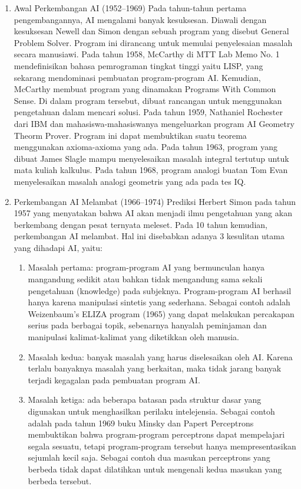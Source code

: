 \begin{enumerate}
	\item Awal Perkembangan AI (1952–1969)
	\hfill\break
	Pada tahun-tahun pertama pengembangannya, AI mengalami banyak kesuksesan. Diawali dengan kesuksesan Newell dan Simon dengan sebuah program yang disebut General Problem Solver. Program ini dirancang untuk memulai penyelesaian masalah secara manusiawi. Pada tahun 1958, McCarthy di MTT Lab Memo No. 1 mendefinisikan bahasa pemrograman tingkat tinggi yaitu LISP, yang sekarang mendominasi pembuatan program-program AI. Kemudian, McCarthy membuat program yang dinamakan Programs With Common Sense. Di dalam program tersebut, dibuat rancangan untuk menggunakan pengetahuan dalam mencari solusi. Pada tahun 1959, Nathaniel Rochester dari IBM dan mahasiswa-mahasiswanya mengeluarkan program AI Geometry Theorm Prover. Program ini dapat membuktikan suatu teorema menggunakan axioma-axioma yang ada. Pada tahun 1963, program yang dibuat James Slagle mampu menyelesaikan masalah integral tertutup untuk mata kuliah kalkulus. Pada tahun 1968, program analogi buatan Tom Evan menyelesaikan masalah analogi geometris yang ada pada tes IQ.

	\item Perkembangan AI Melambat (1966–1974)
	\hfill\break
	Prediksi Herbert Simon pada tahun 1957 yang menyatakan bahwa AI akan menjadi ilmu pengetahuan yang akan berkembang dengan pesat ternyata meleset. Pada 10 tahun kemudian, perkembangan AI melambat. Hal ini disebabkan adanya 3 kesulitan utama yang dihadapi AI, yaitu:
	\begin{enumerate}
		\item Masalah pertama: program-program AI yang bermunculan hanya mangandung sedikit atau bahkan tidak mengandung sama sekali pengetahuan (knowledge) pada subjeknya. Program-program AI berhasil hanya karena manipulasi sintetis yang sederhana. Sebagai contoh adalah Weizenbaum’s ELIZA program (1965) yang dapat melakukan percakapan serius pada berbagai topik, sebenarnya hanyalah peminjaman dan manipulasi kalimat-kalimat yang diketikkan oleh manusia.
		\item Masalah kedua: banyak masalah yang harus diselesaikan oleh AI. Karena terlalu banyaknya masalah yang berkaitan, maka tidak jarang banyak terjadi kegagalan pada pembuatan program AI.
		\item Masalah ketiga: ada beberapa batasan pada struktur dasar yang digunakan untuk menghasilkan perilaku intelejensia. Sebagai contoh adalah pada tahun 1969 buku Minsky dan Papert Perceptrons membuktikan bahwa program-program perceptrons dapat mempelajari segala sesuatu, tetapi program-program tersebut hanya mempresentasikan sejumlah kecil saja. Sebagai contoh dua masukan perceptrons yang berbeda tidak dapat dilatihkan untuk mengenali kedua masukan yang berbeda tersebut.
	\end{enumerate}


\end{enumerate}
